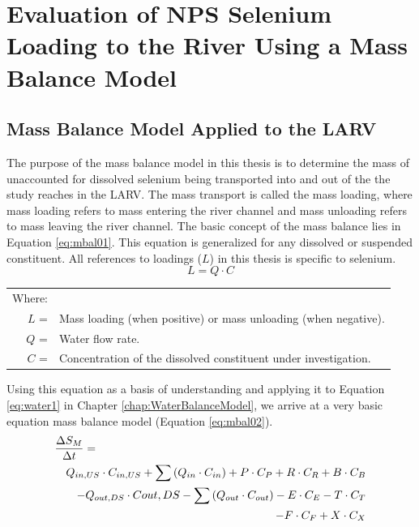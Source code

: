 \renewcommand{\thechapter}{5}
\chapter{Evaluation of NPS Selenium Loading to the River Using a Mass Balance Model}
\label{chap:MassBalanceModel}

\begin{linenumbers}
\section{Mass Balance Model Applied to the LARV}
\label{sec:AppliedMassModel}

The purpose of the mass balance model in this thesis is to determine the mass of unaccounted for dissolved selenium being transported into and out of the the study reaches in the LARV.  The mass transport is called the mass loading, where mass loading refers to mass entering the river channel and mass unloading refers to mass leaving the river channel.  The basic concept of the mass balance lies in Equation \ref{eq:mbal01}.  This equation is generalized for any dissolved or suspended constituent.  All references to loadings ($ L $) in this thesis is specific to selenium.
\begin{equation}
	\label{eq:mbal01}
	L=Q \cdot C
\end{equation}
\begin{tabular}{r p{5.5in}}
		Where:  \\
		$ L $ = & Mass loading (when positive) or mass unloading (when negative).\\
		$ Q $ = & Water flow rate.\\
		$ C $ = & Concentration of the dissolved constituent under investigation.\\
\end{tabular}

Using this equation as a basis of understanding and applying it to Equation \ref{eq:water1} in Chapter \ref{chap:WaterBalanceModel}, we arrive at a very basic equation mass balance model (Equation \ref{eq:mbal02}).
\begin{eqnarray}
	\label{eq:mbal02}
	\lefteqn{\frac{\Delta S_M}{\Delta t}=} \\
	\nonumber & &  Q_{in,US} \cdot C_{in,US} + \sum \left( Q_{in} \cdot C_{in} \right) + P \cdot C_P + R \cdot C_R  + B \cdot C_B\\
	\nonumber & & - Q_{out,DS} \cdot C{out,DS} - \sum \left( Q_{out} \cdot C_{out} \right) - E \cdot C_E - T \cdot C_T \\
	\nonumber & & - F \cdot C_F + X \cdot C_X
\end{eqnarray}


\end{linenumbers}
